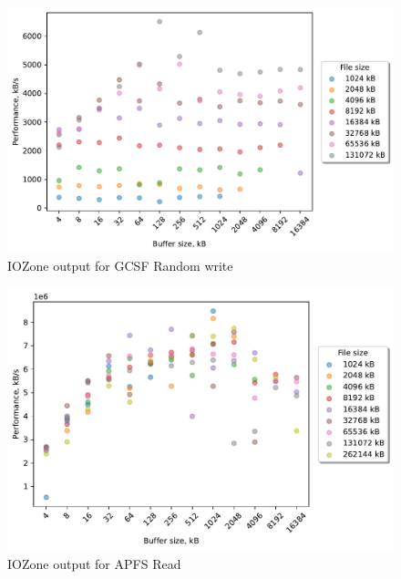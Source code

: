 \begin{figure}[!htb]
	\label{fig:bench_gcsf_rnd_write}
	\begin{center}
		\includegraphics[width=1.0\textwidth]{figures/benchmarking/gcsf/Random write.pdf}
	\end{center}
	\caption{IOZone output for GCSF Random write}
\end{figure}

\begin{figure}[!htb]
	\label{fig:bench_apfs_read}
	\begin{center}
		\includegraphics[width=1.0\textwidth]{figures/benchmarking/local/Read.pdf}
	\end{center}
	\caption{IOZone output for \gls{APFS} Read}
\end{figure}

